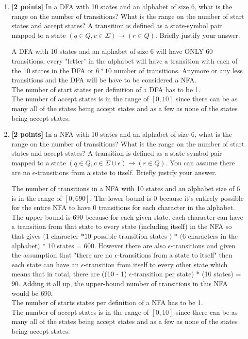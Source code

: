 \documentclass[11pt]{article}
\theoremstyle{definition}
\theoremstyle{theorem}
\newcommand{\solution}{\medskip\noindent{\color{blue}\textbf{Solution:}}}
\begin{document}
\begin{enumerate}[label=(\alph*)]

\item \textbf{[2 points]}   In a DFA with 10 states and an alphabet of size 6, what is the range on the number of transitions? What is the range on the number of start states and accept states? A transition is defined as a state-symbol pair mapped to a state $(q \in Q, c \in \Sigma) \rightarrow (r \in Q)$. Briefly justify your answer.

\solution

A DFA with 10 states and an alphabet of size 6 will have ONLY 60 transitions, every "letter" in the alphabet will have a transition with each of the 10 states in the DFA or $6 * 10$ number of transitions. Anymore or any less transitions and the DFA will be have to be considered a NFA.
\\[3ex] The number of start states per definition of a DFA has to be 1.
\\[3ex] The number of accept states is in the range of $[0, 10]$ since there can be as many all of the states being accept states and as a few as none of the states being accept states.


\item \textbf{[2 points]}    In a NFA with 10 states and an alphabet of size 6, what is the range on the number of transitions? What is the range on the number of start states and accept states? A transition is defined as a state-symbol pair mapped to a state $(q \in Q, c \in \Sigma \cup \epsilon) \rightarrow (r \in Q)$. You can assume there are no $\epsilon$-transitions from a state to itself. Briefly justify your answer.


\solution

The number of transitions in a NFA with 10 states and an alphabet size of 6 is in the range of $[0, 690]$. The lower bound is 0 because it's entirely possible for the entire NFA to have 0 transitions for each character in the alphabet.
The upper bound is 690 because for each given state, each character can have a transition from that state to every state (including itself) in the NFA so that gives $(1$ character $* 10$ possible transition states $)$ $*$ $(6$ characters in the alphabet$)$ * 10 states = 600.
However there are also $\epsilon$-transitions and given the assumption that "there are no $\epsilon$-transitions from a state to itself" then each state can have an $\epsilon$-transition from itself to every other state which means that in total, there are ((10 - 1) $\epsilon$-transition per state) * (10 states) = 90.
Adding it all up, the upper-bound number of transitions in this NFA would be $690$.
\\[3ex] The number of starts states per definition of a NFA has to be 1.
\\[3ex] The number of accept states is in the range of $[0, 10]$ since there can be as many all of the states being accept states and as a few as none of the states being accept states.


\end{enumerate}
\end{document}
